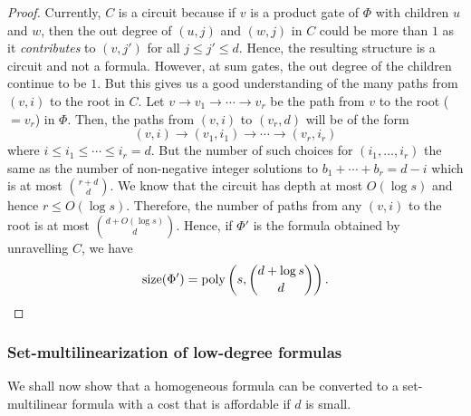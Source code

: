 \begin{proof}
\medskip

Currently, $C$ is a circuit because if $v$ is a product gate of $\Phi$ with children $u$ and $w$, then the out degree of $(u, j)$ and $(w, j)$ in $C$ could be more than $1$ as it \emph{contributes} to $(v,j')$ for all $j \leq j' \leq d$.
Hence, the resulting structure is a circuit and not a formula.
However, at sum gates, the out degree of the children continue to be $1$.
But this gives us a good understanding of the many paths from $(v,i)$ to the root in $C$.
Let $v\rightarrow v_1 \rightarrow \cdots \rightarrow v_r$ be the path from $v$ to the root ($=v_r$) in $\Phi$. Then, the paths from $(v,i)$ to $(v_r,d)$ will be of the form
\[
(v,i) \rightarrow (v_1,i_1) \rightarrow \cdots \rightarrow (v_r,i_r)
\]
where $i \leq i_1 \leq \cdots \leq i_r = d$.
But the number of such choices for $(i_1,\ldots, i_r)$ the same as the number of non-negative integer solutions to $b_1 + \cdots + b_r = d-i$ which is at most $\binom{r + d}{d}$.
We know that the circuit has depth at most $O(\log s)$ and hence $r \leq O(\log s)$.
Therefore, the number of paths from any $(v,i)$ to the root is at most $\binom{d + O(\log s)}{d}$.
Hence, if $\Phi'$ is the formula obtained by unravelling $C$, we have
\[
\mathrm{size}(\Phi') = \operatorname{poly}\left(s,\binom{d+\log s}{d}\right).\qedhere
\]
\end{proof}

\subsubsection*{Set-multilinearization of low-degree formulas}

We shall now show that a homogeneous formula can be converted to a set-multilinear formula with a cost that is affordable if $d$ is small. 

